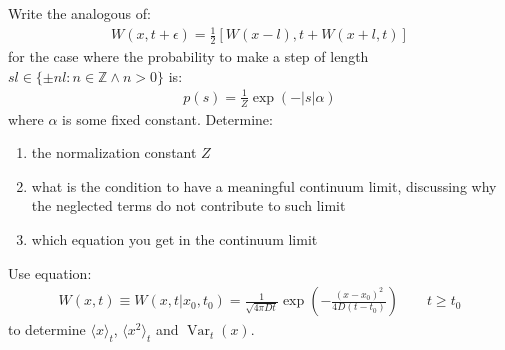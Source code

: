 \documentclass[../template.tex]{subfiles}
\begin{document}
\begin{exo}
    Write the analogous of:
    \begin{align*}
        W(x,t+\epsilon) = \frac{1}{2}[W(x-l),t + W(x+l,t)] 
    \end{align*}
    for the case where the probability to make a step of length $sl \in \{\pm nl \colon n \in \mathbb{Z} \land n > 0\}$ is:
    \begin{align*}
        p(s) = \frac{1}{Z} \exp\left(-|s| \alpha\right) 
    \end{align*}
    where $\alpha$ is some fixed constant. Determine:
    \begin{enumerate}
        \item the normalization constant $Z$
        \item what is the condition to have a meaningful continuum limit, discussing why the neglected terms do not contribute to such limit
        \item which equation you get in the continuum limit 
    \end{enumerate}
\end{exo}

\begin{exo}
    Use equation:
    \begin{align*}
        W(x,t) \equiv W(x,t|x_0, t_0) = \frac{1}{\sqrt{4 \pi D t}} \exp\left(-\frac{(x-x_0)^2}{4 D (t-t_0)} \right) \qquad t\geq t_0  
    \end{align*}
    to determine $\langle x \rangle_t$, $\langle x^2 \rangle_t$ and $\operatorname{Var}_t(x)$.   
\end{exo}
\end{document}
